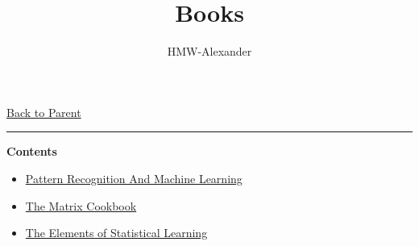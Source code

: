 \documentclass[letterpaper,11pt]{article}
\title{\textbf{Books}}
\author{HMW-Alexander}
\newcommand{\panhline}{\begin{center}\rule{\textwidth}{1pt}\end{center}}
\begin{document}
\maketitle
\href{../index.html}{Back to Parent}

\panhline
\textbf{Contents}

\begin{itemize}
	\item \href{./Pattern_Recognition_And_Machine_Learning.pdf}{Pattern Recognition And Machine Learning}
	\item \href{./The_Matrix_Cookbook.pdf}{The Matrix Cookbook}
	\item \href{./The_Elements_of_Statistical_Learning.pdf}{The Elements of Statistical Learning}
\end{itemize}
\end{document}
